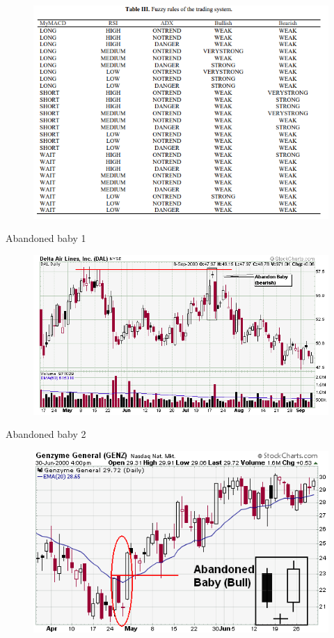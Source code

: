\documentclass{beamer}
\begin{document}
\begin{frame}{}
\begin{figure}[h]
  \includegraphics[width=\textwidth]{img/fuzzy_rules.png}
\end{figure}
\end{frame}

\begin{frame}{Abandoned baby 1}
\begin{figure}[h]
  \includegraphics[width=\textwidth]{img/baby1.png}
\end{figure}
\end{frame}

\begin{frame}{Abandoned baby 2}
\begin{figure}[h]
  \includegraphics[width=\textwidth]{img/baby2.png}
\end{figure}
\end{frame}
\end{document}
